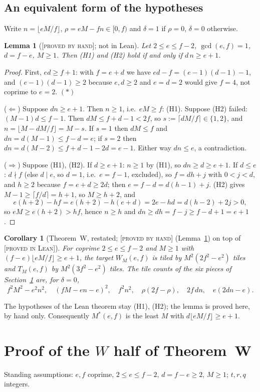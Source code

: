 \documentclass[11pt,reqno]{amsart}
\theoremstyle{plain}
\newtheorem{lemma}[theorem]{Lemma}
\newtheorem{corollary}[theorem]{Corollary}
\theoremstyle{definition}
\newcommand{\lab}[1]{\textup{[\textsc{#1}]}}
\newcommand{\PL}{\lab{proved in Lean}}
\newcommand{\PH}{\lab{proved by hand}}
\begin{document}
\subsection{An equivalent form of the hypotheses}\label{sub:equiv}
Write $n=\lfloor eM/f\rfloor$, $\rho=eM-fn\in[0,f)$ and $\delta=1$ if $\rho=0$, $\delta=0$ otherwise.
\begin{lemma}[\PH{}; not in Lean]\label{lem:equiv}
Let $2\le e\le f-2$, $\gcd(e,f)=1$, $d=f-e$, $M\ge1$. Then (H1) and (H2) hold if and only if $d\,n\ge e+1$.
\end{lemma}
\begin{proof}
First, $ed\ge f+1$: with $f=e+d$ we have $ed-f=(e-1)(d-1)-1$, and $(e-1)(d-1)\ge2$ because $e,d\ge2$ and $e=d=2$ would give $f=4$, not coprime to $e=2$. $(\ast)$

($\Leftarrow$) Suppose $dn\ge e+1$. Then $n\ge1$, i.e.\ $eM\ge f$: (H1). Suppose (H2) failed: $(M-1)d\le f-1$. Then $dM\le f+d-1<2f$, so $s:=\lceil dM/f\rceil\in\{1,2\}$, and $n=\lfloor M-dM/f\rfloor=M-s$. If $s=1$ then $dM\le f$ and $dn=d(M-1)\le f-d=e$; if $s=2$ then $dn=d(M-2)\le f+d-1-2d=e-1$. Either way $dn\le e$, a contradiction.

($\Rightarrow$) Suppose (H1), (H2). If $d\ge e+1$: $n\ge1$ by (H1), so $dn\ge d\ge e+1$. If $d\le e$: $d\nmid f$ (else $d\mid e$, so $d=1$, i.e.\ $e=f-1$, excluded), so $f=dh+j$ with $0<j<d$, and $h\ge2$ because $f=e+d\ge2d$; then $e=f-d=d(h-1)+j$. (H2) gives $M-1\ge\lceil f/d\rceil=h+1$, so $M\ge h+2$, and
\[
e(h+2)-hf=e(h+2)-h(e+d)=2e-hd=d(h-2)+2j>0,
\]
so $eM\ge e(h+2)>hf$, hence $n\ge h$ and $dn\ge dh=f-j\ge f-d+1=e+1$.
\end{proof}
\begin{corollary}[Theorem~W, restated; \PH{} (Lemma~\ref{lem:equiv}) on top of \PL{}]\label{cor:equiv}
For coprime $2\le e\le f-2$ and $M\ge1$ with $(f-e)\lfloor eM/f\rfloor\ge e+1$, the target $W_M(e,f)$ is tiled by $M^2(2f^2-e^2)$ tiles and $T_M(e,f)$ by $M^2(3f^2-e^2)$ tiles. The tile counts of the six pieces of Section~\ref{sec:proof} are, for $\delta=0$,
\[
f^2M^2-e^2n^2,\quad (fM-en-e)^2,\quad f^2n^2,\quad \rho(2f-\rho),\quad 2f\,dn,\quad e(2dn-e).
\]
\end{corollary}
\noindent The hypotheses of the Lean theorem stay (H1), (H2); the lemma is proved here, by hand only. Consequently $M^*(e,f)$ is the least $M$ with $d\lfloor eM/f\rfloor\ge e+1$.

\section{Proof of the $W$ half of Theorem~W}\label{sec:proof}
Standing assumptions: $e,f$ coprime, $2\le e\le f-2$, $d=f-e\ge2$, $M\ge1$; $t,r,q$ integers.
\end{document}
